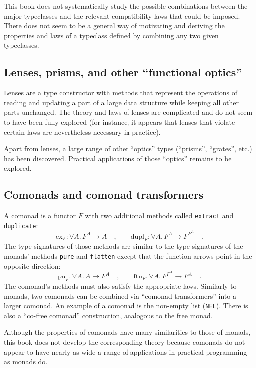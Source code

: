This book does not systematically study the possible combinations
between the major typeclasses and the relevant compatibility laws
that could be imposed. There does not seem to be a general way of
motivating and deriving the properties and laws of a typeclass defined
by combining any two given typeclasses.

\subsection{Lenses, prisms, and other \textquotedblleft functional optics\textquotedblright}

Lenses are a type constructor with methods that represent the operations
of reading and updating a part of a large data structure while keeping
all other parts unchanged. The theory and laws of lenses are complicated
and do not seem to have been fully explored (for instance, it appears
that lenses that violate certain laws are nevertheless necessary in
practice). 

Apart from lenses, a large range of other \textsf{``}optics\textsf{''} types (\textsf{``}prisms\textsf{''},
\textsf{``}grates\textsf{''}, etc.) has been discovered. Practical applications of
those \textsf{``}optics\textsf{''} remains to be explored.

\subsection{Comonads and comonad transformers}

A comonad is a functor $F$ with two additional methods called \lstinline!extract!
and \lstinline!duplicate!:
\[
\text{ex}_{F}:\forall A.\,F^{A}\rightarrow A\quad,\quad\quad\text{dupl}_{F}:\forall A.\,F^{A}\rightarrow F^{F^{A}}\quad.
\]
The type signatures of those methods are similar to the type signatures
of the monads\textsf{'} methods \lstinline!pure! and \lstinline!flatten!
except that the function arrows point in the opposite direction:
\[
\text{pu}_{F}:\forall A.\,A\rightarrow F^{A}\quad,\quad\quad\text{ftn}_{F}:\forall A.\,F^{F^{A}}\rightarrow F^{A}\quad.
\]
The comonad\textsf{'}s methods must also satisfy the appropriate laws. Similarly
to monads, two comonads can be combined via \textsf{``}comonad transformers\textsf{''}
into a larger comonad. An example of a comonad is the non-empty list
(\lstinline!NEL!). There is also a \textsf{``}co-free comonad\textsf{''} construction,
analogous to the free monad.

Although the properties of comonads have many similarities to those
of monads, this book does not develop the corresponding theory because
comonads do not appear to have nearly as wide a range of applications
in practical programming as monads do.

